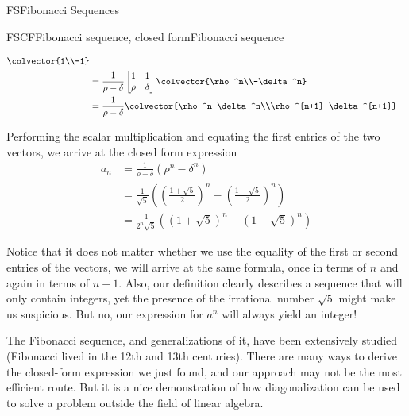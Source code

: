 \begin{subsect}{FS}{Fibonacci Sequences}
\begin{example}{FSCF}{Fibonacci sequence, closed form}{Fibonacci sequence}
\begin{para}
\begin{align*}
\colvector{1\\-1}\\
&=
\frac{1}{\rho-\delta}
\begin{bmatrix}1&1\\\rho&\delta\end{bmatrix}
\colvector{\rho^n\\-\delta^n}\\
&=
\frac{1}{\rho-\delta}
\colvector{\rho^n-\delta^n\\\rho^{n+1}-\delta^{n+1}}
\end{align*}
\end{para}
%
\begin{para}Performing the scalar multiplication and equating the first entries of the two vectors, we arrive at the closed form expression
%
\begin{align*}
a_n&=\frac{1}{\rho-\delta}\left(\rho^n-\delta^n\right)\\
&=\frac{1}{\sqrt{5}}
\left(\left(\frac{1+\sqrt{5}}{2}\right)^n-\left(\frac{1-\sqrt{5}}{2}\right)^n\right)\\
&=\frac{1}{2^n\sqrt{5}}
\left(\left(1+\sqrt{5}\right)^n-\left(1-\sqrt{5}\right)^n\right)
\end{align*}
\end{para}
%
\begin{para}Notice that it does not matter whether we use the equality of the first or second entries of the vectors, we will arrive at the same formula, once in terms of $n$ and again in terms of $n+1$.  Also, our definition clearly describes a sequence that will only contain integers, yet the presence of the irrational number $\sqrt{5}$ might make us suspicious.  But no, our expression for $a^n$ will always yield an integer!\end{para}
%
\begin{para}The Fibonacci sequence, and generalizations of it, have been extensively studied (Fibonacci lived in the 12th and 13th centuries).  There are many ways to derive the closed-form expression we just found, and our approach may not be the most efficient route.  But it is a nice demonstration of how diagonalization can be used to solve a problem outside the field of linear algebra.\end{para}
\end{example}
%

\end{subsect}
